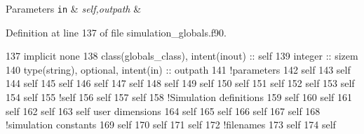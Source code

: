 \begin{DoxyParams}[1]{Parameters}
\mbox{\tt in}  & {\em self,outpath} & \\
\hline
\end{DoxyParams}


Definition at line 137 of file simulation\+\_\+globals.\+f90.


\begin{DoxyCode}
137     \textcolor{keywordtype}{implicit none}
138     \textcolor{keywordtype}{class}(globals\_class), \textcolor{keywordtype}{intent(inout)} :: self
139     \textcolor{keywordtype}{integer} :: sizem
140     \textcolor{keywordtype}{type}(string), \textcolor{keywordtype}{optional}, \textcolor{keywordtype}{intent(in)} :: outpath
141     \textcolor{comment}{!parameters}
142     self%
143     self%
144     self%
145     self%
146     self%
147     self%
148     self%
149     self%
150     self%
151     self%
152     self%
153     self%
154     self%
155     \textcolor{comment}{!self%
156     self%
157     self%
158     \textcolor{comment}{!Simulation definitions}
159     self%
160     self%
161     self%
162     self%
163     self%
       user dimensions}
164     self%
165     self%
166     self%
167     self%
168     \textcolor{comment}{!simulation constants}
169     self%
170     self%
171     self%
172     \textcolor{comment}{!filenames}
173     self%
174     self%

\end{DoxyCode}
